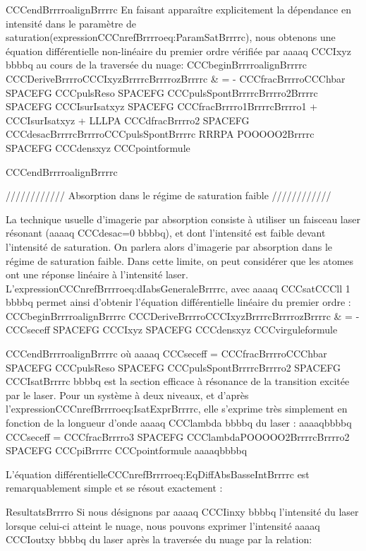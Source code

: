 CCCendBrrrroalignBrrrrc
En faisant apparaître explicitement la dépendance en intensité dans le paramètre de saturation(expressionCCCnrefBrrrroeq:ParamSatBrrrrc), nous obtenons une équation différentielle non-linéaire du premier ordre vérifiée par aaaaq CCCIxyz bbbbq au cours de la traversée du nuage:
CCCbeginBrrrroalignBrrrrc
	CCCDeriveBrrrroCCCIxyzBrrrrcBrrrrozBrrrrc
	& = - CCCfracBrrrroCCChbar SPACEFG CCCpulsReso SPACEFG  CCCpulsSpontBrrrrcBrrrro2Brrrrc 
	 SPACEFG  CCCIsurIsatxyz 
	 SPACEFG  CCCfracBrrrro1BrrrrcBrrrro1 + CCCIsurIsatxyz +  LLLPA CCCdfracBrrrro2 SPACEFG CCCdesacBrrrrcBrrrroCCCpulsSpontBrrrrc RRRPA POOOOO2Brrrrc
	 SPACEFG  CCCdensxyz 
	CCCpointformule
	
CCCendBrrrroalignBrrrrc

//////////// Absorption dans le régime de saturation faible ////////////

La technique usuelle d'imagerie par absorption consiste à utiliser un faisceau laser résonant (aaaaq CCCdesac=0 bbbbq), et dont l'intensité est faible devant l'intensité de saturation. On parlera alors d'imagerie par absorption dans le régime de saturation faible. Dans cette limite, on peut considérer que les atomes ont une réponse linéaire à l'intensité laser.
L'expressionCCCnrefBrrrroeq:dIabsGeneraleBrrrrc, avec aaaaq CCCsatCCCll 1 bbbbq permet ainsi d'obtenir l'équation différentielle linéaire du premier ordre :
CCCbeginBrrrroalignBrrrrc
	CCCDeriveBrrrroCCCIxyzBrrrrcBrrrrozBrrrrc
	& =
	- CCCseceff
	 SPACEFG  CCCIxyz
	 SPACEFG  CCCdensxyz
	CCCvirguleformule
	
CCCendBrrrroalignBrrrrc
où aaaaq CCCseceff = CCCfracBrrrroCCChbar SPACEFG CCCpulsReso SPACEFG  CCCpulsSpontBrrrrcBrrrro2 SPACEFG CCCIsatBrrrrc bbbbq est la section efficace à résonance de la transition excitée par le laser. Pour un système à deux niveaux, et d'après l'expressionCCCnrefBrrrroeq:IsatExprBrrrrc, elle s'exprime très simplement en fonction de la longueur d'onde aaaaq CCClambda bbbbq du laser :
aaaaqbbbbq
CCCseceff = CCCfracBrrrro3 SPACEFG CCClambdaPOOOOO2BrrrrcBrrrro2 SPACEFG CCCpiBrrrrc
CCCpointformule
aaaaqbbbbq


L'équation différentielleCCCnrefBrrrroeq:EqDiffAbsBasseIntBrrrrc est remarquablement simple et se résout exactement :




ResultatsBrrrro
Si nous désignons par aaaaq CCCIinxy bbbbq l'intensité du laser lorsque celui-ci atteint le nuage, nous pouvons exprimer l'intensité aaaaq CCCIoutxy bbbbq du laser après la traversée du nuage par la relation:



